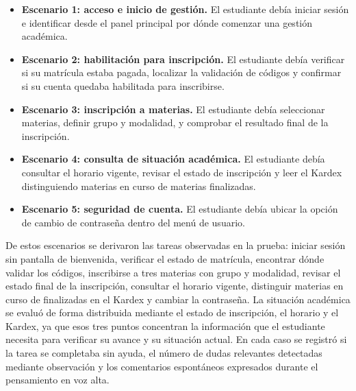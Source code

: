 \begin{itemize}
  \item \textbf{Escenario 1: acceso e inicio de gestión.} El estudiante debía iniciar sesión e identificar desde el panel principal por dónde comenzar una gestión académica.
  \item \textbf{Escenario 2: habilitación para inscripción.} El estudiante debía verificar si su matrícula estaba pagada, localizar la validación de códigos y confirmar si su cuenta quedaba habilitada para inscribirse.
  \item \textbf{Escenario 3: inscripción a materias.} El estudiante debía seleccionar materias, definir grupo y modalidad, y comprobar el resultado final de la inscripción.
  \item \textbf{Escenario 4: consulta de situación académica.} El estudiante debía consultar el horario vigente, revisar el estado de inscripción y leer el Kardex distinguiendo materias en curso de materias finalizadas.
  \item \textbf{Escenario 5: seguridad de cuenta.} El estudiante debía ubicar la opción de cambio de contraseña dentro del menú de usuario.
\end{itemize}

De estos escenarios se derivaron las tareas observadas en la prueba: iniciar sesión sin pantalla de bienvenida, verificar el estado de matrícula, encontrar dónde validar los códigos, inscribirse a tres materias con grupo y modalidad, revisar el estado final de la inscripción, consultar el horario vigente, distinguir materias en curso de finalizadas en el Kardex y cambiar la contraseña. La situación académica se evaluó de forma distribuida mediante el estado de inscripción, el horario y el Kardex, ya que esos tres puntos concentran la información que el estudiante necesita para verificar su avance y su situación actual. En cada caso se registró si la tarea se completaba sin ayuda, el número de dudas relevantes detectadas mediante observación y los comentarios espontáneos expresados durante el pensamiento en voz alta.


